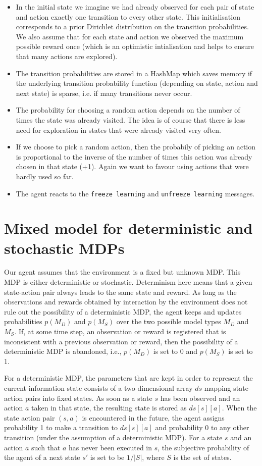 \documentclass{scrartcl}
\begin{document}
    \begin{itemize}
        \item In the initial state we imagine we had already observed for each pair of state and action exactly one transition to every other state. This initialisation corresponds to a prior Dirichlet distribution on the transition probabilities. We also assume that for each state and action we observed the maximum possible reward once (which is an optimistic intialisation and helps to ensure that many actions are explored).
        \item The transition probabilities are stored in a HashMap which saves memory if the underlying transition probability function (depending on state, action and next state) is sparse, i.e. if many transitions never occur.
        \item The probability for choosing a random action depends on the number of times the state was already visited. The idea is of course that there is less need for exploration in states that were already visited very often.
        \item If we choose to pick a random action, then the probabily of picking an action is proportional to the inverse of the number of times this action was already chosen in that state (+1). Again we want to favour using actions that were hardly used so far.
        \item The agent reacts to the \texttt{freeze learning} and \texttt{unfreeze learning} messages.
    \end{itemize}

\section{Mixed model for deterministic and stochastic MDPs}
Our agent assumes that the environment is a fixed but unknown MDP. This MDP is either deterministic or stochastic. Determinism here means that a given state-action pair always leads to the same state and reward. As long as the observations and rewards obtained by interaction by the environment does not rule out the possibility of a deterministic MDP, the agent keeps and updates probabilities $p(M_D)$ and $p(M_S)$ over the two possible model types $M_D$ and $M_S$. If, at some time step, an observation or reward is registered that is inconsistent with a previous observation or reward, then the possibility of a deterministic MDP is abandoned, i.e., $p(M_D)$ is set to 0 and $p(M_S)$ is set to 1.

For a deterministic MDP, the parameters that are kept in order to represent the current information state consists of a two-dimensional array $ds$ mapping state-action pairs into fixed states. As soon as a state $s$ has been observed and an action $a$ taken in that state, the resulting state is stored as $ds[s][a]$. When the state action pair $(s,a)$ is encountered in the future, the agent assigns probability 1 to make a transition to $ds[s][a]$ and probability 0 to any other transition (under the assumption of a deterministic MDP). For a state $s$ and an action $a$ such that $a$ has never been executed in $s$, the subjective probability of the agent of a next state $s'$ is set to be $1 / |S|$, where $S$ is the set of states. 
\end{document}
